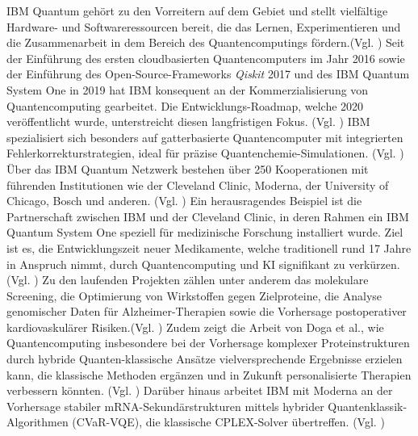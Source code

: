 IBM Quantum gehört zu den Vorreitern auf dem Gebiet und stellt vielfältige Hardware- und Softwareressourcen bereit, die das Lernen, Experimentieren und die Zusammenarbeit in dem Bereich des Quantencomputings fördern.(Vgl. \cite{abughanemIBMQuantumComputers2025}) 
Seit der Einführung des ersten cloudbasierten Quantencomputers im Jahr 2016 sowie der Einführung des Open-Source-Frameworks \textit{Qiskit} 2017 und des IBM Quantum System One in 2019 hat IBM konsequent an der Kommerzialisierung von Quantencomputing gearbeitet. Die Entwicklungs-Roadmap, welche 2020 veröffentlicht wurde, unterstreicht diesen langfristigen Fokus. (Vgl. \cite{jaygambettaIBMRoadmapQuantumcentric2022})
IBM spezialisiert sich besonders auf gatterbasierte Quantencomputer mit integrierten Fehlerkorrekturstrategien, ideal für präzise Quantenchemie-Simulationen. (Vgl. \cite{bravyiHighthresholdLowoverheadFaulttolerant2024, mullerImprovedBeliefPropagation2025})
Über das IBM Quantum Netzwerk bestehen über 250 Kooperationen mit führenden Institutionen wie der Cleveland Clinic, Moderna, der University of Chicago, Bosch und anderen. (Vgl. \cite{noauthor_ibm_nodate})
Ein herausragendes Beispiel ist die Partnerschaft zwischen IBM und der Cleveland Clinic, in deren Rahmen ein IBM Quantum System One speziell für medizinische Forschung installiert wurde. Ziel ist es, die Entwicklungszeit neuer Medikamente, welche traditionell rund 17 Jahre in Anspruch nimmt, durch Quantencomputing und KI signifikant zu verkürzen.(Vgl. \cite{noauthor_cleveland_2023}) Zu den laufenden Projekten zählen unter anderem das molekulare Screening, die Optimierung von Wirkstoffen gegen Zielproteine, die Analyse genomischer Daten für Alzheimer-Therapien sowie die Vorhersage postoperativer kardiovaskulärer Risiken.(Vgl. \cite{flotherHowQuantumComputing2025}) 
Zudem zeigt die Arbeit von Doga et al., wie Quantencomputing insbesondere bei der Vorhersage komplexer Proteinstrukturen durch hybride Quanten-klassische Ansätze vielversprechende Ergebnisse erzielen kann, die klassische Methoden ergänzen und in Zukunft personalisierte Therapien verbessern könnten. (Vgl. \cite{doga_perspective_2024})
Darüber hinaus arbeitet IBM mit Moderna an der Vorhersage stabiler mRNA-Sekundärstrukturen mittels hybrider Quantenklassik-Algorithmen (CVaR-VQE), die klassische CPLEX-Solver übertreffen. (Vgl. \cite{hou_lipid_2021})\\

